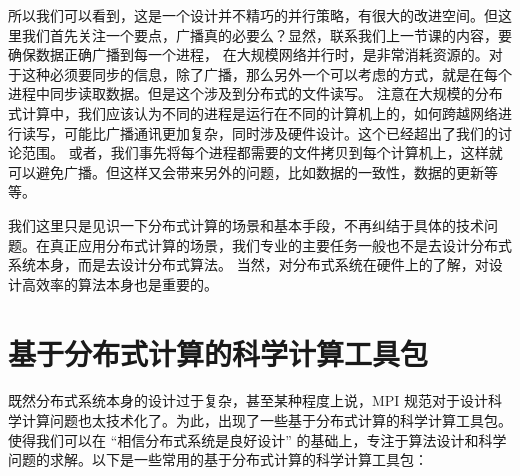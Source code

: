 \documentclass{ctexart}
\begin{document}
所以我们可以看到，这是一个设计并不精巧的并行策略，有很大的改进空间。但这里我们首先关注一个要点，广播真的必要么？显然，联系我们上一节课的内容，要确保数据正确广播到每一个进程，
在大规模网络并行时，是非常消耗资源的。对于这种必须要同步的信息，除了广播，那么另外一个可以考虑的方式，就是在每个进程中同步读取数据。但是这个涉及到分布式的文件读写。
注意在大规模的分布式计算中，我们应该认为不同的进程是运行在不同的计算机上的，如何跨越网络进行读写，可能比广播通讯更加复杂，同时涉及硬件设计。这个已经超出了我们的讨论范围。
或者，我们事先将每个进程都需要的文件拷贝到每个计算机上，这样就可以避免广播。但这样又会带来另外的问题，比如数据的一致性，数据的更新等等。

我们这里只是见识一下分布式计算的场景和基本手段，不再纠结于具体的技术问题。在真正应用分布式计算的场景，我们专业的主要任务一般也不是去设计分布式系统本身，而是去设计分布式算法。
当然，对分布式系统在硬件上的了解，对设计高效率的算法本身也是重要的。

\section{基于分布式计算的科学计算工具包}

既然分布式系统本身的设计过于复杂，甚至某种程度上说，MPI 规范对于设计科学计算问题也太技术化了。为此，出现了一些基于分布式计算的科学计算工具包。
使得我们可以在 ``相信分布式系统是良好设计'' 的基础上，专注于算法设计和科学问题的求解。以下是一些常用的基于分布式计算的科学计算工具包：
\end{document}
